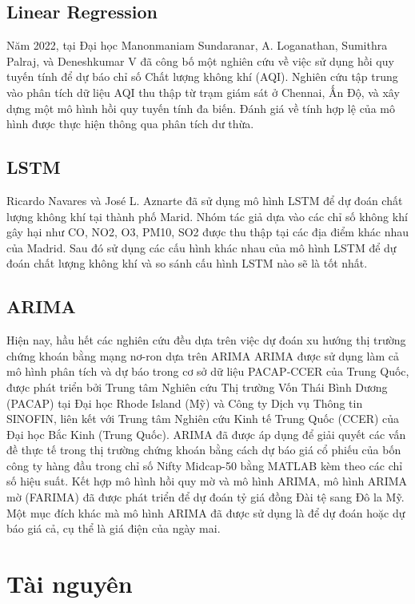\documentclass[conference]{IEEEtran}
\begin{document}
\subsection{Linear Regression}
Năm 2022, tại Đại học Manonmaniam Sundaranar, A. Loganathan, Sumithra Palraj, và Deneshkumar V đã công bố một nghiên cứu về việc sử dụng hồi quy tuyến tính để dự báo chỉ số Chất lượng không khí (AQI). Nghiên cứu tập trung vào phân tích dữ liệu AQI thu thập từ trạm giám sát ở Chennai, Ấn Độ, và xây dựng một mô hình hồi quy tuyến tính đa biến. Đánh giá về tính hợp lệ của mô hình được thực hiện thông qua phân tích dư thừa. \cite{b18}

\subsection{LSTM}
Ricardo Navares và José L. Aznarte đã sử dụng mô hình LSTM để dự đoán chất lượng không khí tại thành phố Marid. Nhóm tác giả dựa vào các chỉ số không khí gây hại như CO, NO2, O3, PM10, SO2 được thu thập tại các địa điểm khác nhau của Madrid. Sau đó sử dụng các cấu hình khác nhau của mô hình LSTM để dự đoán chất lượng không khí và so sánh cấu hình LSTM nào sẽ là tốt nhất. \cite{b12}

\subsection{ARIMA}
Hiện nay, hầu hết các nghiên cứu đều dựa trên việc dự đoán xu hướng thị trường chứng khoán bằng mạng nơ-ron dựa trên ARIMA \cite{b13} ARIMA được sử dụng làm cả mô hình phân tích và dự báo trong cơ sở dữ liệu PACAP‐CCER của Trung Quốc, được phát triển bởi Trung tâm Nghiên cứu Thị trường Vốn Thái Bình Dương (PACAP) tại Đại học Rhode Island (Mỹ) và Công ty Dịch vụ Thông tin SINOFIN, liên kết với Trung tâm Nghiên cứu Kinh tế Trung Quốc (CCER) của Đại học Bắc Kinh (Trung Quốc). \cite{b14} ARIMA đã được áp dụng để giải quyết các vấn đề thực tế trong thị trường chứng khoán bằng cách dự báo giá cổ phiếu của bốn công ty hàng đầu trong chỉ số Nifty Midcap-50 bằng MATLAB kèm theo các chỉ số hiệu suất. \cite{b15} Kết hợp mô hình hồi quy mờ và mô hình ARIMA, mô hình ARIMA mờ (FARIMA) đã được phát triển để dự đoán tỷ giá đồng Đài tệ sang Đô la Mỹ. \cite{b16} Một mục đích khác mà mô hình ARIMA đã được sử dụng là để dự đoán hoặc dự báo giá cả, cụ thể là giá điện của ngày mai.

\section{Tài nguyên}
\end{document}
